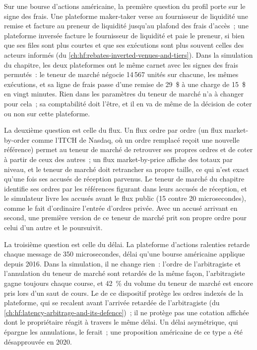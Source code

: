 Sur une bourse d'actions américaine, la première question du profil porte sur le signe des frais. Une plateforme maker-taker verse au fournisseur de liquidité une remise et facture au preneur de liquidité jusqu'au
plafond des frais d'accès~; une plateforme inversée facture le fournisseur de liquidité et paie le preneur, si bien que ses files sont plus courtes et que ses exécutions sont plus souvent celles des acteurs informés
(du \cref{ch:hf:rebates-inverted-venues-and-tiers}). Dans la simulation du chapitre, les deux plateformes ont le même carnet avec les signes des frais permutés~: le teneur de marché négocie
14\,567 unités sur chacune, les mêmes exécutions, et sa ligne de frais passe d'une remise de 29~\$ à une charge de 15~\$ en vingt minutes. Rien dans les
paramètres du teneur de marché n'a à changer pour cela~; sa comptabilité doit l'être, et il en va de même de la décision de coter ou non sur cette plateforme.

La deuxième question est celle du flux. Un flux ordre par ordre (un flux market-by-order comme l'ITCH de Nasdaq, où un ordre remplacé reçoit une nouvelle référence)
permet au teneur de marché de retrouver ses propres ordres et de coter à partir de ceux des autres~; un flux market-by-price affiche des totaux par niveau, et le teneur de marché doit retrancher sa propre
taille, ce qui n'est exact qu'une fois ses accusés de réception parvenus. Le teneur de marché du chapitre identifie ses ordres par les références figurant dans leurs
accusés de réception, et le simulateur livre les accusés avant le flux public (15 contre 20 microsecondes), comme le fait d'ordinaire l'entrée
d'ordres privée. Avec un accusé arrivant en second, une première version de ce teneur de marché prit son propre ordre pour celui d'un autre et le poursuivit.

La troisième question est celle du délai. La plateforme d'actions ralenties retarde chaque message de 350 microsecondes, délai qu'une bourse américaine applique depuis 2016.
Dans la simulation, il ne change rien~: l'ordre de l'arbitragiste et l'annulation du teneur de marché sont retardés de la même façon, l'arbitragiste gagne toujours chaque course, et 42~\%
du volume du teneur de marché est encore pris lors d'un saut de cours. Le  de ce dispositif protège les ordres indexés de la plateforme, qui se recalent avant l'arrivée retardée
de l'arbitragiste (du \cref{ch:hf:latency-arbitrage-and-its-defence})~; il ne protège pas une cotation affichée dont le propriétaire réagit à travers le même délai.
Un délai asymétrique, qui épargne les annulations, le ferait~; une proposition américaine de ce type a été désapprouvée en 2020.

